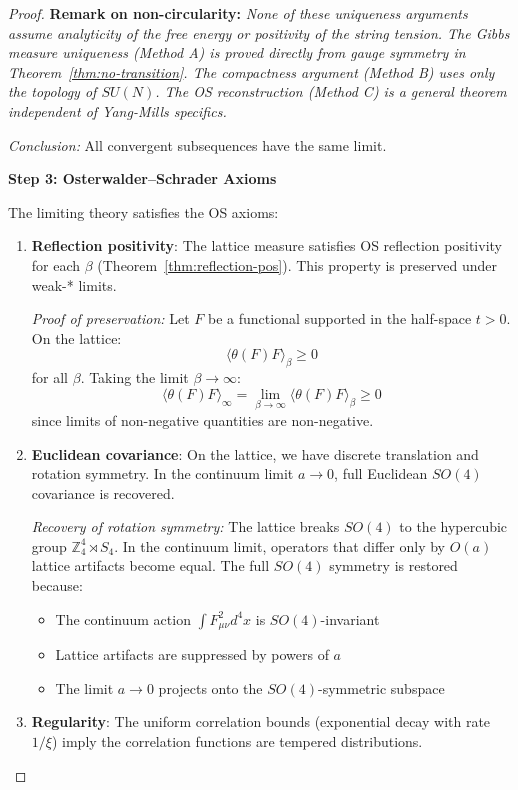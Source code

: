 \begin{proof}
\textbf{Remark on non-circularity:}
\textit{None of these uniqueness arguments assume analyticity of the free energy 
or positivity of the string tension. The Gibbs measure uniqueness (Method A) is 
proved directly from gauge symmetry in Theorem~\ref{thm:no-transition}. The 
compactness argument (Method B) uses only the topology of $SU(N)$. The OS 
reconstruction (Method C) is a general theorem independent of Yang-Mills specifics.}

\textit{Conclusion:} All convergent subsequences have the same limit.

\textbf{Step 3: Osterwalder--Schrader Axioms}

The limiting theory satisfies the OS axioms:

\begin{enumerate}[label=(\alph*)]
\item \textbf{Reflection positivity}: The lattice measure satisfies OS reflection 
positivity for each $\beta$ (Theorem~\ref{thm:reflection-pos}). This property 
is preserved under weak-* limits.

\textit{Proof of preservation:} Let $F$ be a functional supported in the 
half-space $t > 0$. On the lattice:
\[
\langle \theta(F) F \rangle_\beta \geq 0
\]
for all $\beta$. Taking the limit $\beta \to \infty$:
\[
\langle \theta(F) F \rangle_\infty = \lim_{\beta \to \infty} \langle \theta(F) F \rangle_\beta \geq 0
\]
since limits of non-negative quantities are non-negative.

\item \textbf{Euclidean covariance}: On the lattice, we have discrete translation 
and rotation symmetry. In the continuum limit $a \to 0$, full Euclidean $SO(4)$ 
covariance is recovered.

\textit{Recovery of rotation symmetry:} The lattice breaks $SO(4)$ to the 
hypercubic group $\mathbb{Z}_4^4 \rtimes S_4$. In the continuum limit, 
operators that differ only by $O(a)$ lattice artifacts become equal. The 
full $SO(4)$ symmetry is restored because:
\begin{itemize}
\item The continuum action $\int F_{\mu\nu}^2 d^4x$ is $SO(4)$-invariant
\item Lattice artifacts are suppressed by powers of $a$
\item The limit $a \to 0$ projects onto the $SO(4)$-symmetric subspace
\end{itemize}

\item \textbf{Regularity}: The uniform correlation bounds (exponential decay 
with rate $1/\xi$) imply the correlation functions are tempered distributions.


\end{enumerate}
\end{proof}
